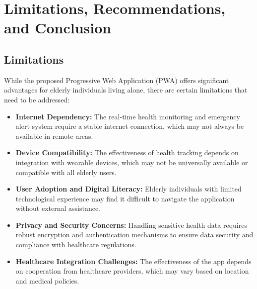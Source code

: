 \chapter{Limitations, Recommendations, and Conclusion}

\section{Limitations}
While the proposed Progressive Web Application (PWA) offers significant advantages for elderly individuals living alone, there are certain limitations that need to be addressed:

\begin{itemize}
    \item \textbf{Internet Dependency:} The real-time health monitoring and emergency alert system require a stable internet connection, which may not always be available in remote areas.
    \item \textbf{Device Compatibility:} The effectiveness of health tracking depends on integration with wearable devices, which may not be universally available or compatible with all elderly users.
    \item \textbf{User Adoption and Digital Literacy:} Elderly individuals with limited technological experience may find it difficult to navigate the application without external assistance.
    \item \textbf{Privacy and Security Concerns:} Handling sensitive health data requires robust encryption and authentication mechanisms to ensure data security and compliance with healthcare regulations.
    \item \textbf{Healthcare Integration Challenges:} The effectiveness of the app depends on cooperation from healthcare providers, which may vary based on location and medical policies.
\end{itemize}

